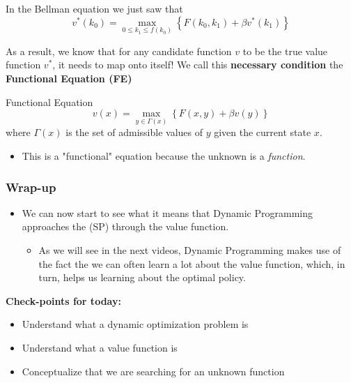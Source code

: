 \documentclass[aspectratio=169]{beamer}
\begin{document}
\begin{frame}
In the Bellman equation we just saw that 
\begin{equation*}
v^*(k_0) = \max_{0 \leq k_{1} \leq f(k_0)} \left\lbrace F(k_0, k_1) + \beta v^*(k_1) \right\rbrace
\end{equation*}

As a result, we know that for any candidate function $v$ to be the true value function $v^*$, it needs to map onto itself! We call this \color{blue}\textbf{necessary condition} \color{black} the \textbf{Functional Equation (FE)}

\begin{block}{Functional Equation}
\begin{equation}
v(x) = \max_{y \in \Gamma(x)} \left\lbrace F(x, y) + \beta v(y) \right\rbrace \tag{FE}
\end{equation}
where $\Gamma(x)$ is the set of admissible values of $y$ given the current state $x$.
\end{block}
\begin{itemize}
\item This is a "functional" equation because the unknown is a \textit{function}.
\end{itemize}
\end{frame}

\begin{frame}
\frametitle{Wrap-up}
\begin{itemize}
\item We can now start to see what it means that Dynamic Programming approaches the (SP) through the value function. 
\begin{itemize}
\item As we will see in the next videos, Dynamic Programming makes use of the fact the we can often learn a lot about the value function, which, in turn, helps us learning about the optimal policy.
\end{itemize}
\end{itemize}
\medskip

\textbf{Check-points for today:}
\begin{itemize}
\item Understand what a dynamic optimization problem is
\item Understand what a value function is
\item Conceptualize that we are searching for an unknown function
\end{itemize}
\end{frame}
\end{document}
